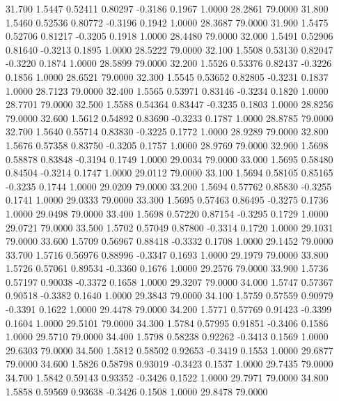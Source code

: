   31.700   1.5447   0.52411   0.80297  -0.3186   0.1967   1.0000  28.2861  79.0000
  31.800   1.5460   0.52536   0.80772  -0.3196   0.1942   1.0000  28.3687  79.0000
  31.900   1.5475   0.52706   0.81217  -0.3205   0.1918   1.0000  28.4480  79.0000
  32.000   1.5491   0.52906   0.81640  -0.3213   0.1895   1.0000  28.5222  79.0000
  32.100   1.5508   0.53130   0.82047  -0.3220   0.1874   1.0000  28.5899  79.0000
  32.200   1.5526   0.53376   0.82437  -0.3226   0.1856   1.0000  28.6521  79.0000
  32.300   1.5545   0.53652   0.82805  -0.3231   0.1837   1.0000  28.7123  79.0000
  32.400   1.5565   0.53971   0.83146  -0.3234   0.1820   1.0000  28.7701  79.0000
  32.500   1.5588   0.54364   0.83447  -0.3235   0.1803   1.0000  28.8256  79.0000
  32.600   1.5612   0.54892   0.83690  -0.3233   0.1787   1.0000  28.8785  79.0000
  32.700   1.5640   0.55714   0.83830  -0.3225   0.1772   1.0000  28.9289  79.0000
  32.800   1.5676   0.57358   0.83750  -0.3205   0.1757   1.0000  28.9769  79.0000
  32.900   1.5698   0.58878   0.83848  -0.3194   0.1749   1.0000  29.0034  79.0000
  33.000   1.5695   0.58480   0.84504  -0.3214   0.1747   1.0000  29.0112  79.0000
  33.100   1.5694   0.58105   0.85165  -0.3235   0.1744   1.0000  29.0209  79.0000
  33.200   1.5694   0.57762   0.85830  -0.3255   0.1741   1.0000  29.0333  79.0000
  33.300   1.5695   0.57463   0.86495  -0.3275   0.1736   1.0000  29.0498  79.0000
  33.400   1.5698   0.57220   0.87154  -0.3295   0.1729   1.0000  29.0721  79.0000
  33.500   1.5702   0.57049   0.87800  -0.3314   0.1720   1.0000  29.1031  79.0000
  33.600   1.5709   0.56967   0.88418  -0.3332   0.1708   1.0000  29.1452  79.0000
  33.700   1.5716   0.56976   0.88996  -0.3347   0.1693   1.0000  29.1979  79.0000
  33.800   1.5726   0.57061   0.89534  -0.3360   0.1676   1.0000  29.2576  79.0000
  33.900   1.5736   0.57197   0.90038  -0.3372   0.1658   1.0000  29.3207  79.0000
  34.000   1.5747   0.57367   0.90518  -0.3382   0.1640   1.0000  29.3843  79.0000
  34.100   1.5759   0.57559   0.90979  -0.3391   0.1622   1.0000  29.4478  79.0000
  34.200   1.5771   0.57769   0.91423  -0.3399   0.1604   1.0000  29.5101  79.0000
  34.300   1.5784   0.57995   0.91851  -0.3406   0.1586   1.0000  29.5710  79.0000
  34.400   1.5798   0.58238   0.92262  -0.3413   0.1569   1.0000  29.6303  79.0000
  34.500   1.5812   0.58502   0.92653  -0.3419   0.1553   1.0000  29.6877  79.0000
  34.600   1.5826   0.58798   0.93019  -0.3423   0.1537   1.0000  29.7435  79.0000
  34.700   1.5842   0.59143   0.93352  -0.3426   0.1522   1.0000  29.7971  79.0000
  34.800   1.5858   0.59569   0.93638  -0.3426   0.1508   1.0000  29.8478  79.0000
